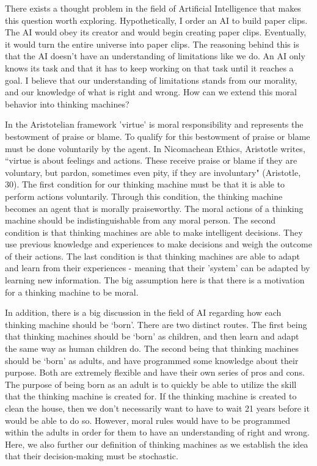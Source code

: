 \documentclass[11pt]{article}
\begin{document}
\par There exists a thought problem in the field of Artificial Intelligence that makes this question worth exploring. Hypothetically, I order an AI to build paper clips. The AI would obey its creator and would begin creating paper clips. Eventually, it would turn the entire universe into paper clips. The reasoning behind this is that the AI doesn't have an understanding of limitations like we do. An AI only knows its task and that it has to keep working on that task until it reaches a goal. I believe that our understanding of limitations stands from our morality, and our knowledge of what is right and wrong. How can we extend this moral behavior into thinking machines?

\par In the Aristotelian framework 'virtue' is moral responsibility and represents the bestowment of praise or blame. To qualify for this bestowment of praise or blame must be done voluntarily by the agent. In Nicomachean Ethics, Aristotle writes, ``virtue is about feelings and actions. These receive praise or blame if they are voluntary, but pardon, sometimes even pity, if they are involuntary" (Aristotle, 30). The first condition for our thinking machine must be that it is able to perform actions voluntarily. Through this condition, the thinking machine becomes an agent that is morally praiseworthy. The moral actions of a thinking machine should be indistinguishable from any moral person. The second condition is that thinking machines are able to make intelligent decisions. They use previous knowledge and experiences to make decisions and weigh the outcome of their actions. The last condition is that thinking machines are able to adapt and learn from their experiences - meaning that their 'system' can be adapted by learning new information. The big assumption here is that there is a motivation for a thinking machine to be moral.

\par In addition, there is a big discussion in the field of AI regarding how each thinking machine should be `born'. There are two distinct routes. The first being that thinking machines should be `born' as children, and then learn and adapt the same way as human children do. The second being that thinking machines should be `born' as adults, and have programmed some knowledge about their purpose. Both are extremely flexible and have their own series of pros and cons. The purpose of being born as an adult is to quickly be able to utilize the skill that the thinking machine is created for. If the thinking machine is created to clean the house, then we don't necessarily want to have to wait 21 years before it would be able to do so. However, moral rules would have to be programmed within the adults in order for them to have an understanding of right and wrong. Here, we also further our definition of thinking machines as we establish the idea that their decision-making must be stochastic.
\end{document}
